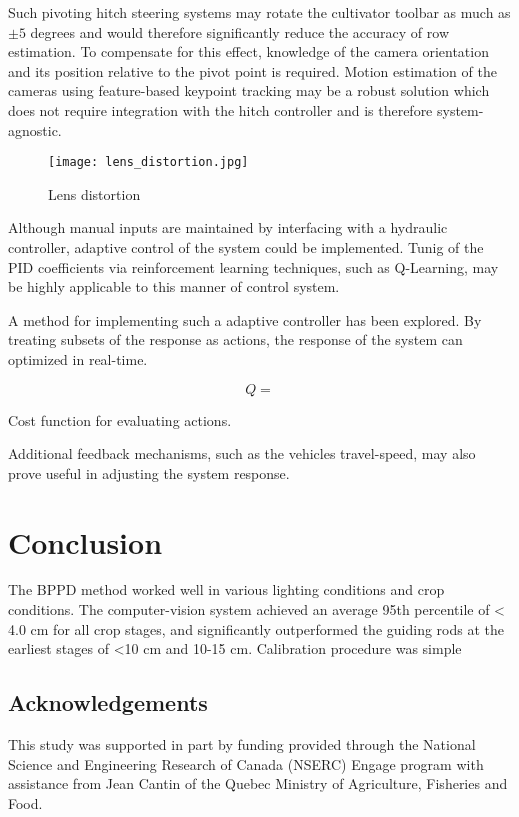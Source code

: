 Such pivoting hitch steering systems may rotate the cultivator toolbar
as much as $\pm5$ degrees and would therefore significantly
reduce the accuracy of row estimation. To compensate for this effect,
knowledge of the camera orientation and its position relative to the
pivot point is required. Motion estimation of the cameras using
feature-based keypoint tracking may be a robust solution which does
not require integration with the hitch controller and is therefore
system-agnostic.

\begin{figure}
  \centering
  \texttt{[image: lens\_distortion.jpg]}
  \caption{Lens distortion}
  \label{fig:distortion}
\end{figure}

Although manual inputs are maintained by interfacing with a hydraulic
controller, adaptive control of the system could be implemented. Tunig
of the PID coefficients via reinforcement learning techniques, such as
Q-Learning, may be highly applicable to this manner of control system.

A method for implementing such a adaptive controller has been
explored. By treating subsets of the response as actions, the
response of the system can optimized in real-time. 

\begin{equation}
  Q = 
  \label{eq:qlearning}
\end{equation}
\begin{flushleft}
Cost function for evaluating actions.
\end{flushleft}

Additional feedback mechanisms, such as the vehicles travel-speed, may
also prove useful in adjusting the system response.

\section{Conclusion}
The BPPD method worked well in various lighting conditions and crop conditions.
The computer-vision system achieved an average 95th percentile of <
4.0 cm for all crop stages, and significantly outperformed the guiding
rods at the earliest stages of <10 cm and 10-15 cm. Calibration
procedure was simple

\subsection{Acknowledgements}
This study was supported in part by funding provided through the
National Science and Engineering Research of Canada (NSERC) Engage
program with assistance from Jean Cantin of the Quebec Ministry of
Agriculture, Fisheries and Food.
